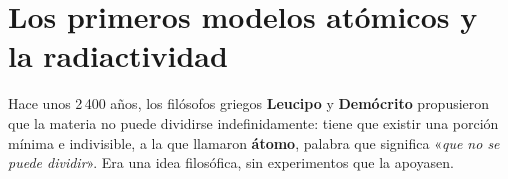 %
%
%

\section{Los primeros modelos atómicos y la radiactividad}

Hace unos 2\,400 años, los filósofos griegos \textbf{Leucipo} y \textbf{Demócrito} propusieron que la materia no puede dividirse indefinidamente: tiene que existir una porción mínima e indivisible, a la que llamaron \textbf{átomo}, palabra que significa «\emph{que no se puede dividir}». Era una idea filosófica, sin experimentos que la apoyasen.

